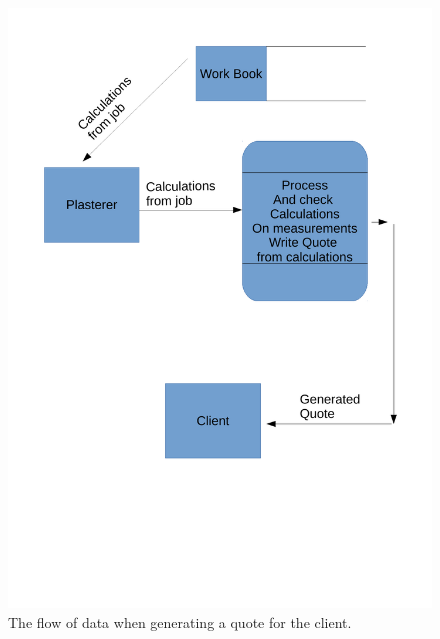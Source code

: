 \begin{figure}[H]
    \includegraphics[width=\textwidth]{./Analysis/images/GeneratingQuote.pdf}
    \caption{The flow of data when generating a quote for the client.} \label{fig:generating_quote_data_flow_diagram}
\end{figure}

